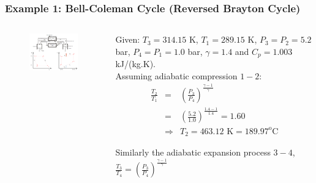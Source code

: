 \documentclass[10pt,compress]{beamer}
\newcommand{\frc}{\displaystyle\frac}
\begin{document}
\begin{frame}
 \frametitle{Example 1: Bell-Coleman Cycle (Reversed Brayton Cycle)}
  \begin{columns}

   \begin{column}[c]{0.53\linewidth}
    \begin{figure}%
     \begin{center}
      \includegraphics[width=6.8cm,height=6.cm]{./Pics/Overview_Refrig6}
     \end{center}
    \end{figure}  
   \end{column}  


   \begin{column}[c]{0.47\linewidth}
    Given: $T_{3}=314.15$ K, $T_{1}=289.15$ K, $P_{3}=P_{2}=5.2$ bar, $P_{4}=P_{1}=1.0$ bar, $\gamma=1.4$ and $C_{p}=1.003$ kJ/(kg.K).\\

    Assuming adiabatic compression $1-2$:
    \begin{eqnarray}
     \frc{T_{2}}{T_{1}}&=&\left(\frc{P_{3}}{P_{4}}\right)^{\frc{\gamma-1}{\gamma}} \nonumber \\
                      & =& \left(\frc{5.2}{1.0}\right)^{\frc{1.4-1}{1.4}} =1.60 \nonumber \\
                      &\Rightarrow& T_{2}= 463.12 \text{ K} = 189.97^{\text{o}}\text{C} \nonumber
    \end{eqnarray}

   Similarly the adiabatic expansion process $3-4$, $\frc{T_{3}}{T_{4}}=\left(\frc{P_{3}}{P_{4}}\right)^{\frc{\gamma-1}{\gamma}}$
   \end{column}
  \end{columns}

\end{frame}
\end{document}
